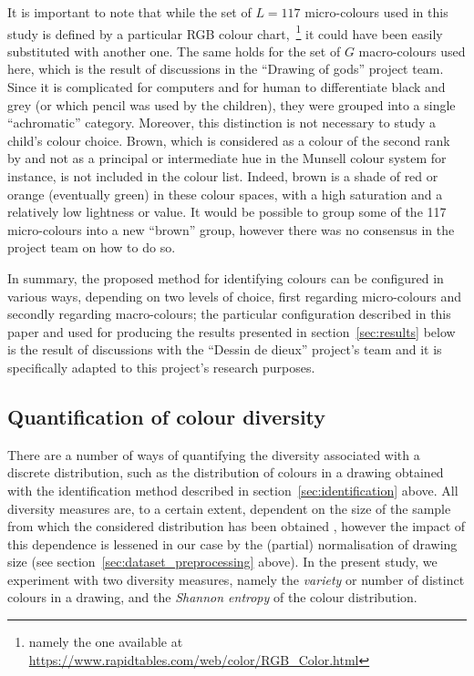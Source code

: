 \documentclass[11pt,a4paper]{article}
\begin{document}
It is important to note that while the set of $L=117$ micro-colours used in this study is defined by a particular RGB colour chart,~\footnote{namely the one available at \url{https://www.rapidtables.com/web/color/RGB_Color.html}} it could have been easily substituted with another one. The same holds for the set of $G$ macro-colours used here, which is the result of discussions in the ``Drawing of gods'' project team. Since it is complicated for computers and for human to differentiate black and grey (or which pencil was used by the children), they were grouped into a single ``achromatic'' category. Moreover, this distinction is not necessary to study a child's colour choice. Brown, which is considered as a colour of the second rank by \citet{pastoureau2017} and not as a principal or intermediate hue in the Munsell colour system for instance, is not included in the colour list. Indeed, brown is a shade of red or orange (eventually green) in these colour spaces, with a high saturation and a relatively low lightness or value. It would be possible to group some of the 117 micro-colours into a new ``brown'' group, however there was no consensus in the project team on how to do so.

In summary, the proposed method for identifying colours can be configured in various ways, depending on two levels of choice, first regarding micro-colours and secondly regarding macro-colours; the particular configuration described in this paper and used for producing the results presented in section~\ref{sec:results} below is the result of discussions with the ``Dessin de dieux'' project's team and it is specifically adapted to this project's research purposes.

\subsection{Quantification of colour diversity}
\label{sec:diversity}

There are a number of ways of quantifying the diversity associated with a discrete distribution, such as the distribution of colours in a drawing obtained with the identification method described in section~\ref{sec:identification} above. All diversity measures are, to a certain extent, dependent on the size of the sample from which the considered distribution has been obtained \cite[see e.g.][]{TweedieBaayen1998}, however the impact of this dependence is lessened in our case by the (partial) normalisation of drawing size (see section~\ref{sec:dataset_preprocessing} above). In the present study, we experiment with two diversity measures, namely the {\em variety} or number of distinct colours in a drawing, and the {\em Shannon entropy} of the colour distribution.
\end{document}
